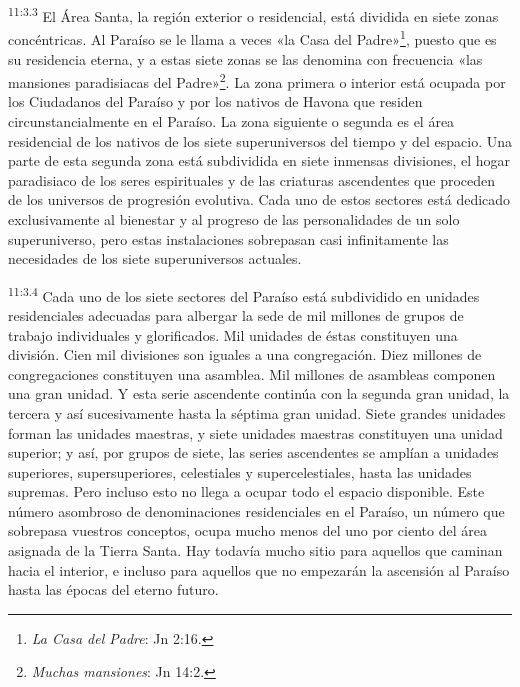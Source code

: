 \par
\textsuperscript{11:3.3} El Área Santa, la región exterior o residencial, está dividida en siete zonas concéntricas. Al Paraíso se le llama a veces «la Casa del Padre»\footnote{\textit{La Casa del Padre}: Jn 2:16.}, puesto que es su residencia eterna, y a estas siete zonas se las denomina con frecuencia «las mansiones paradisiacas del Padre»\footnote{\textit{Muchas mansiones}: Jn 14:2.}. La zona primera o interior está ocupada por los Ciudadanos del Paraíso y por los nativos de Havona que residen circunstancialmente en el Paraíso. La zona siguiente o segunda es el área residencial de los nativos de los siete superuniversos del tiempo y del espacio. Una parte de esta segunda zona está subdividida en siete inmensas divisiones, el hogar paradisiaco de los seres espirituales y de las criaturas ascendentes que proceden de los universos de progresión evolutiva. Cada uno de estos sectores está dedicado exclusivamente al bienestar y al progreso de las personalidades de un solo superuniverso, pero estas instalaciones sobrepasan casi infinitamente las necesidades de los siete superuniversos actuales.

\par
\textsuperscript{11:3.4} Cada uno de los siete sectores del Paraíso está subdividido en unidades residenciales adecuadas para albergar la sede de mil millones de grupos de trabajo individuales y glorificados. Mil unidades de éstas constituyen una división. Cien mil divisiones son iguales a una congregación. Diez millones de congregaciones constituyen una asamblea. Mil millones de asambleas componen una gran unidad. Y esta serie ascendente continúa con la segunda gran unidad, la tercera y así sucesivamente hasta la séptima gran unidad. Siete grandes unidades forman las unidades maestras, y siete unidades maestras constituyen una unidad superior; y así, por grupos de siete, las series ascendentes se amplían a unidades superiores, supersuperiores, celestiales y supercelestiales, hasta las unidades supremas. Pero incluso esto no llega a ocupar todo el espacio disponible. Este número asombroso de denominaciones residenciales en el Paraíso, un número que sobrepasa vuestros conceptos, ocupa mucho menos del uno por ciento del área asignada de la Tierra Santa. Hay todavía mucho sitio para aquellos que caminan hacia el interior, e incluso para aquellos que no empezarán la ascensión al Paraíso hasta las épocas del eterno futuro.

